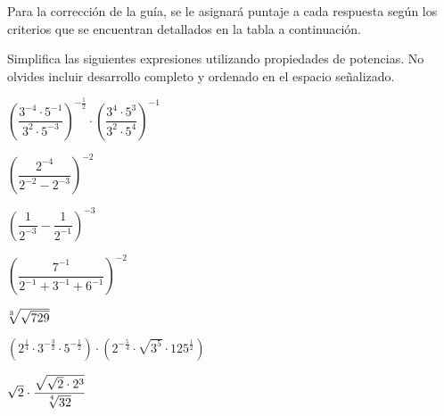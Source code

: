 \documentclass{prueba}
\begin{document}

Para la corrección de la guía, se le asignará puntaje a cada respuesta según los criterios
que se encuentran detallados en la tabla a continuación.

\pauta
\newpage

\parte{} Simplifica las siguientes expresiones utilizando propiedades de potencias. 
No olvides incluir desarrollo completo y ordenado en el espacio señalizado. 

%
\pregunta{} $\left(\dfrac{3^{-4}\cdot 5^{-1}}{3^2\cdot 5^{-3}}\right)^{-\frac{1}{2}}\cdot\left(\dfrac{3^4\cdot 5^3}{3^2\cdot 5^4}\right)^{-1}$
\desarrollo[5.5cm]

\pregunta{} $\left(\dfrac{2^{-4}}{2^{-2}-2^{-3}}\right)^{-2}$
\desarrollo[5.5cm]

\pregunta{} $\left(\dfrac{1}{2^{-3}} - \dfrac{1}{2^{-1}}\right)^{-3}$
\desarrollo[5.5cm]

\pregunta{} $\left(\dfrac{7^{-1}}{2^{-1}+3^{-1}+6^{-1}}\right)^{-2}$
\desarrollo[6cm]

\pregunta{} $\sqrt[\leftroot{2}3]{\sqrt{729}}$
\desarrollo[6cm]

\pregunta{} $\left(2^{\frac{1}{4}}\cdot 3^{-\frac{3}{2}}\cdot 5^{-\frac{1}{2}}\right)\cdot\left(2^{-\frac{5}{4}}\cdot\sqrt{3^5}\cdot 125^{\frac{1}{2}}\right)$
\desarrollo[6cm]

\newpage
\pregunta{} $\sqrt{2}\cdot\dfrac{\sqrt{\sqrt{2}\cdot 2^3}}{\sqrt[\uproot{2}\leftroot{2}4]{32}}$
\desarrollo[6cm]
\end{document}
